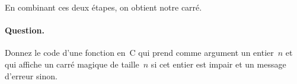 En combinant ces deux \'etapes, on obtient notre carr\'e.

\paragraph{Question.}   
Donnez  le  code d'une  fonction  en~C  qui  prend  comme argument  un
entier~$n$ et qui   affiche un carr\'e  magique  de taille~$n$ si  cet
entier est impair et un message  d'erreur sinon. 

